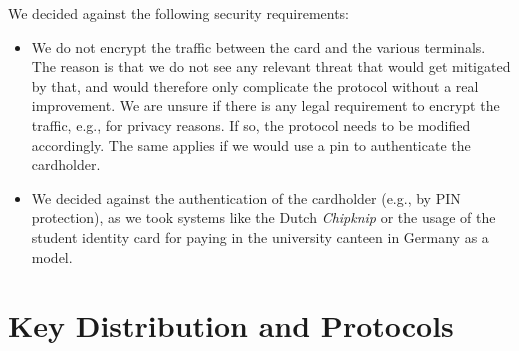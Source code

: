 \documentclass{article}
\begin{document}
We decided against the following security requirements:
\begin{itemize}
    \item We do not encrypt the traffic between the card and the various terminals.
    The reason is that we do not see any relevant threat that would get mitigated by that, and would therefore only complicate the protocol without a real improvement.
    We are unsure if there is any legal requirement to encrypt the traffic, e.g., for privacy reasons.
    If so, the protocol needs to be modified accordingly.
    The same applies if we would use a pin to authenticate the cardholder.
    
    \item We decided against the authentication of the cardholder (e.g., by PIN protection), as we took systems like the Dutch \emph{Chipknip} or the usage of the student identity card for paying in the university canteen in Germany as a model.
\end{itemize}


\section{Key Distribution and Protocols}
\end{document}
